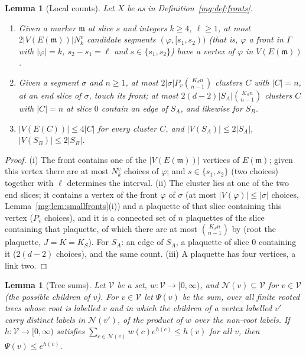 \documentclass[11pt,a4paper]{article}
\newtheorem{lemma}[theorem]{Lemma}
\theoremstyle{definition}
\theoremstyle{remark}
\newcommand{\IIIref}[3]{\cite[#1~`#2' (\texttt{#3})]{III}}
\begin{document}
\begin{lemma}[Local counts]\label{mg:lem:localcounts}
Let $X$ be as in Definition~\ref{mg:def:fronts}.
\begin{enumerate}[label=(\roman*)]
\item Given a marker $\mathfrak m$ at slice $s$ and integers $k\ge4$, $\ell\ge1$, at most $2|V(E(\mathfrak m))|N^v_k$ candidate segments
$(\varphi,[s_1,s_2))$ (that is, $\varphi$ a front in $\Gamma$ with $|\varphi|=k$, $s_2-s_1=\ell$ and $s\in\{s_1,s_2\}$) have a vertex of $\varphi$ in
$V(E(\mathfrak m))$.
\item Given a segment $\sigma$ and $n\ge1$, at most $2|\sigma|P_v\binom{K_Sn}{n-1}$ clusters $C$ with $|C|=n$, at an end slice of $\sigma$, touch its front;
at most $2(d-2)|S_A|\binom{K_Sn}{n-1}$ clusters $C$ with $|C|=n$ at slice $0$ contain an edge of $S_A$, and likewise for $S_B$.
\item $|V(E(C))|\le4|C|$ for every cluster $C$, and $|V(S_A)|\le2|S_A|$, $|V(S_B)|\le2|S_B|$.
\end{enumerate}
\end{lemma}

\begin{proof}
(i) The front contains one of the $|V(E(\mathfrak m))|$ vertices of $E(\mathfrak m)$; given this vertex there are at most $N^v_k$ choices of $\varphi$; and
$s\in\{s_1,s_2\}$ (two choices) together with $\ell$ determines the interval. (ii) The cluster lies at one of the two end slices; it contains a vertex of the
front $\varphi$ of $\sigma$ (at most $|V(\varphi)|\le|\sigma|$ choices, Lemma~\ref{mg:lem:smallfronts}(i)) and a plaquette of that slice containing this
vertex ($P_v$ choices), and it is a connected set of $n$ plaquettes of the slice containing that plaquette, of which there are at most $\binom{K_Sn}{n-1}$
by \IIIref{Lemma}{Rooted counting}{al:lem:rooted} (root the plaquette, $J=K=K_S$). For $S_A$: an edge of $S_A$, a plaquette of slice $0$ containing it
($2(d-2)$ choices), and the same count. (iii) A plaquette has four vertices, a link two.
\end{proof}

\begin{lemma}[Tree sums]\label{mg:lem:treesums}
Let $\mathcal V$ be a set, $w:\mathcal V\to[0,\infty)$, and $\mathcal N(v)\subseteq\mathcal V$ for $v\in\mathcal V$ (the possible children of $v$). For
$v\in\mathcal V$ let $\Psi(v)$ be the sum, over all finite rooted trees whose root is labelled $v$ and in which the children of a vertex labelled $v'$
carry distinct labels in $\mathcal N(v')$, of the product of $w$ over the non-root labels. If $h:\mathcal V\to[0,\infty)$ satisfies
$\sum_{c\in\mathcal N(v)}w(c)e^{h(c)}\le h(v)$ for all $v$, then $\Psi(v)\le e^{h(v)}$.
\end{lemma}
\end{document}
